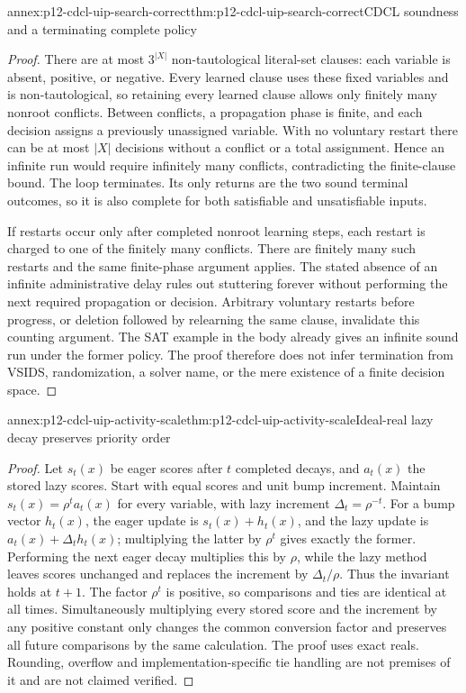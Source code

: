 \begin{annexitem}{annex:p12-cdcl-uip-search-correct}{thm:p12-cdcl-uip-search-correct}{CDCL soundness and a terminating complete policy}
\begin{proof}
There are at most \(3^{\lvert X\rvert}\) non-tautological literal-set
clauses: each variable is absent, positive, or negative.  Every learned clause
uses these fixed variables and is non-tautological, so retaining every learned
clause allows only finitely many nonroot conflicts.  Between conflicts, a
propagation phase is finite, and each decision assigns a previously unassigned
variable.  With no voluntary restart there can be at most \(\lvert X\rvert\)
decisions without a conflict or a total assignment.  Hence an infinite run
would require infinitely many conflicts, contradicting the finite-clause
bound.  The loop terminates.  Its only returns are the two sound terminal
outcomes, so it is also complete for both satisfiable and unsatisfiable inputs.

If restarts occur only after completed nonroot learning steps, each restart
is charged to one of the finitely many conflicts.  There are finitely many
such restarts and the same finite-phase argument applies.  The stated absence
of an infinite administrative delay rules out stuttering forever without
performing the next required propagation or decision.  Arbitrary voluntary
restarts before progress, or deletion followed by relearning the same clause,
invalidate this counting argument.  The SAT example in the body already
gives an infinite sound run under the former policy.  The proof therefore
does not infer termination from VSIDS, randomization, a solver name, or the
mere existence of a finite decision space.
\end{proof}
\end{annexitem}

\begin{annexitem}{annex:p12-cdcl-uip-activity-scale}{thm:p12-cdcl-uip-activity-scale}{Ideal-real lazy decay preserves priority order}
\begin{proof}
Let \(s_t(x)\) be eager scores after \(t\) completed decays, and
\(a_t(x)\) the stored lazy scores.  Start with equal scores and unit bump
increment.  Maintain \(s_t(x)=\rho^t a_t(x)\) for every variable, with
lazy increment \(\Delta_t=\rho^{-t}\).  For a bump vector \(h_t(x)\),
the eager update is \(s_t(x)+h_t(x)\), and the lazy update is
\(a_t(x)+\Delta_t h_t(x)\); multiplying the latter by \(\rho^t\)
gives exactly the former.  Performing the next eager decay multiplies this
by \(\rho\), while the lazy method leaves scores unchanged and replaces
the increment by \(\Delta_t/\rho\).  Thus the invariant holds at
\(t+1\).  The factor \(\rho^t\) is positive, so comparisons and ties
are identical at all times.  Simultaneously multiplying every stored score
and the increment by any positive constant only changes the common conversion
factor and preserves all future comparisons by the same calculation.  The
proof uses exact reals.  Rounding, overflow and implementation-specific tie
handling are not premises of it and are not claimed verified.
\end{proof}
\end{annexitem}

